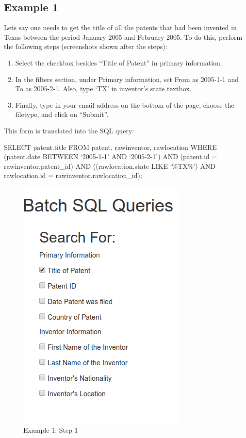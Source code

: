 \subsection{Example 1}
Lets say one needs to get the title of all the patents that had been invented in Texas between the period January 2005 and February 2005. To do this, perform the following steps (screenshots shown after the steps): 

\begin{enumerate}
\item Select the checkbox besides “Title of Patent” in primary information.

\item In the filters section, under Primary information, set From as 2005-1-1 and To as 2005-2-1. Also, type ‘TX’ in inventor’s state textbox. 

\item Finally, type in your email address on the bottom of the page, choose the filetype, and click on “Submit”.
\end{enumerate}

This form is translated into the SQL query:

SELECT patent.title FROM patent, rawinventor, rawlocation WHERE (patent.date BETWEEN ‘2005-1-1’ AND ‘2005-2-1’) AND (patent.id = rawinventor.patent\_id) AND ((rawlocation.state LIKE ‘\%TX\%’) AND rawlocation.id = rawinventor.rawlocation\_id);

\begin{figure}
\center
\includegraphics[width=.8\textwidth]{figs/ex1s1}
\caption{Example 1: Step 1}
\label{fig:Step 1}
\end{figure}

